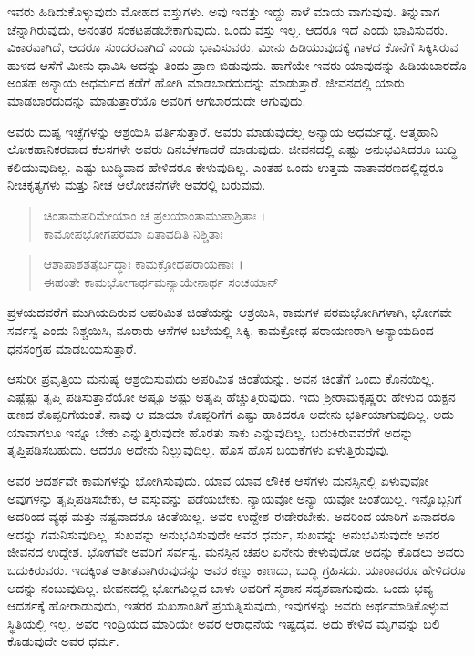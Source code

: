 ಇವರು ಹಿಡಿದುಕೊಳ್ಳುವುದು ಮೋಹದ ವಸ್ತುಗಳು. ಅವು ಇವತ್ತು ಇದ್ದು ನಾಳೆ ಮಾಯ ವಾಗುವುವು. ತಿನ್ನುವಾಗ ಚೆನ್ನಾಗಿರುವುದು, ಅನಂತರ ಸಂಕಟಪಡಬೇಕಾಗುವುದು. ಒಂದು ವಸ್ತು ಇಲ್ಲ. ಆದರೂ ಇದೆ ಎಂದು ಭಾವಿಸುವರು. ವಿಕಾರವಾಗಿದೆ, ಆದರೂ ಸುಂದರವಾಗಿದೆ ಎಂದು ಭಾವಿಸುವರು. ಮೀನು ಹಿಡಿಯುವುದಕ್ಕೆ ಗಾಳದ ಕೊನೆಗೆ ಸಿಕ್ಕಿಸಿರುವ ಹುಳದ ಆಸೆಗೆ ಮೀನು ಧಾವಿಸಿ ಅದನ್ನು ತಿಂದು ಪ್ರಾಣ ಬಿಡುವುದು. ಹಾಗೆಯೇ ಇವರು ಯಾವುದನ್ನು ಹಿಡಿಯಬಾರದೊ ಅಂತಹ ಅನ್ಯಾಯ ಅಧರ್ಮದ ಕಡೆಗೆ ಹೋಗಿ ಮಾಡಬಾರದುದನ್ನು ಮಾಡುತ್ತಾರೆ. ಜೀವನದಲ್ಲಿ ಯಾರು ಮಾಡಬಾರದುದನ್ನು ಮಾಡುತ್ತಾರೆಯೊ ಅವರಿಗೆ ಆಗಬಾರದುದೇ ಆಗುವುದು.

ಅವರು ದುಷ್ಟ ಇಚ್ಛೆಗಳನ್ನು ಆಶ್ರಯಿಸಿ ವರ್ತಿಸುತ್ತಾರೆ. ಅವರು ಮಾಡುವುದೆಲ್ಲ ಅನ್ಯಾಯ ಅಧರ್ಮದ್ದೆ. ಆತ್ಮಹಾನಿ ಲೋಕಹಾನಿಕರವಾದ ಕೆಲಸಗಳೇ ಅವರು ದಿನಬೆಳಗಾದರೆ ಮಾಡುವುದು. ಜೀವನದಲ್ಲಿ ಎಷ್ಟು ಅನುಭವಿಸಿದರೂ ಬುದ್ಧಿ ಕಲಿಯುವುದಿಲ್ಲ. ಎಷ್ಟು ಬುದ್ಧಿವಾದ ಹೇಳಿದರೂ ಕೇಳುವುದಿಲ್ಲ. ಎಂತಹ ಒಂದು ಉತ್ತಮ ವಾತಾವರಣದಲ್ಲಿದ್ದರೂ ನೀಚಕೃತ್ಯಗಳು ಮತ್ತು ನೀಚ ಆಲೋಚನೆಗಳೇ ಅವರಲ್ಲಿ ಬರುವುವು.

\begin{verse}
ಚಿಂತಾಮಪರಿಮೇಯಾಂ ಚ ಪ್ರಲಯಾಂತಾಮುಪಾಶ್ರಿತಾಃ ।\\ಕಾಮೋಪಭೋಗಪರಮಾ ಏತಾವದಿತಿ ನಿಶ್ಚಿತಾಃ 
\end{verse}

\begin{verse}
ಆಶಾಪಾಶಶತೈರ್ಬದ್ಧಾಃ ಕಾಮಕ್ರೋಧಪರಾಯಣಾಃ ।\\ಈಹಂತೇ ಕಾಮಭೋಗಾರ್ಥಮನ್ಯಾಯೇನಾರ್ಥ ಸಂಚಯಾನ್ 
\end{verse}

{\small ಪ್ರಳಯದವರೆಗೆ ಮುಗಿಯದಿರುವ ಅಪರಿಮಿತ ಚಿಂತೆಯನ್ನು ಆಶ್ರಯಿಸಿ, ಕಾಮಗಳ ಪರಮಭೋಗಿಗಳಾಗಿ, ಭೋಗವೇ ಸರ್ವಸ್ವ ಎಂದು ನಿಶ್ಚಯಿಸಿ, ನೂರಾರು ಆಸೆಗಳ ಬಲೆಯಲ್ಲಿ ಸಿಕ್ಕಿ, ಕಾಮಕ್ರೋಧ ಪರಾಯಣರಾಗಿ ಅನ್ಯಾಯದಿಂದ ಧನಸಂಗ್ರಹ ಮಾಡಬಯಸುತ್ತಾರೆ.}

ಆಸುರೀ ಪ್ರವೃತ್ತಿಯ ಮನುಷ್ಯ ಆಶ್ರಯಿಸುವುದು ಅಪರಿಮಿತ ಚಿಂತೆಯನ್ನು. ಅವನ ಚಿಂತೆಗೆ ಒಂದು ಕೊನೆಯಿಲ್ಲ. ಎಷ್ಟೆಷ್ಟು ತೃಪ್ತಿ ಪಡಿಸುತ್ತಾನೆಯೋ ಅಷ್ಟೂ ಅಷ್ಟು ಅತೃಪ್ತಿ ಹೆಚ್ಚುತ್ತಿರುವುದು. ಇದು ಶ್ರೀರಾಮಕೃಷ್ಣರು ಹೇಳುವ ಯಕ್ಷನ ಹಣದ ಕೊಪ್ಪರಿಗೆಯಂತೆ. ನಾವು ಆ ಮಾಯಾ ಕೊಪ್ಪರಿಗೆಗೆ ಎಷ್ಟು ಹಾಕಿದರೂ ಅದೇನು ಭರ್ತಿಯಾಗುವುದಿಲ್ಲ. ಅದು ಯಾವಾಗಲೂ ಇನ್ನೂ ಬೇಕು ಎನ್ನುತ್ತಿರುವುದೇ ಹೊರತು ಸಾಕು ಎನ್ನುವುದಿಲ್ಲ. ಬದುಕಿರುವವರೆಗೆ ಅದನ್ನು ತೃಪ್ತಿಪಡಿಸಬಹುದು. ಆದರೂ ಅದೇನು ನಿಲ್ಲುವುದಿಲ್ಲ. ಹೊಸ ಹೊಸ ಬಯಕೆಗಳು ಏಳುತ್ತಿರುವುವು.

ಅವರ ಆದರ್ಶವೇ ಕಾಮಗಳನ್ನು ಭೋಗಿಸುವುದು. ಯಾವ ಯಾವ ಲೌಕಿಕ ಆಸೆಗಳು ಮನಸ್ಸಿನಲ್ಲಿ ಏಳುವುವೋ ಅವುಗಳನ್ನು ತೃಪ್ತಿಪಡಿಸಬೇಕು, ಆ ವಸ್ತುವನ್ನು ಪಡೆಯಬೇಕು. ನ್ಯಾಯವೋ ಅನ್ಯಾ ಯವೋ ಚಿಂತೆಯಿಲ್ಲ. ಇನ್ನೊಬ್ಬನಿಗೆ ಅದರಿಂದ ವ್ಯಥೆ ಮತ್ತು ನಷ್ಟವಾದರೂ ಚಿಂತೆಯಿಲ್ಲ. ಅವರ ಉದ್ದೇಶ ಈಡೇರಬೇಕು. ಅದರಿಂದ ಯಾರಿಗೆ ಏನಾದರೂ ಅದನ್ನು ಗಮನಿಸುವುದಿಲ್ಲ. ಸುಖವನ್ನು ಅನುಭವಿಸುವುದೇ ಅವರ ಧರ್ಮ, ಸುಖವನ್ನು ಅನುಭವಿಸುವುದೇ ಅವರ ಜೀವನದ ಉದ್ದೇಶ. ಭೋಗವೇ ಅವರಿಗೆ ಸರ್ವಸ್ವ. ಮನಸ್ಸಿನ ಚಪಲ ಏನೇನು ಕೇಳುವುದೋ ಅದನ್ನು ಕೊಡಲು ಅವರು ಬದುಕಿರುವರು. ಇದಕ್ಕಿಂತ ಅತೀತವಾಗಿರುವುದನ್ನು ಅವರ ಕಣ್ಣು ಕಾಣದು, ಬುದ್ಧಿ ಗ್ರಹಿಸದು. ಯಾರಾದರೂ ಹೇಳಿದರೂ ಅದನ್ನು ನಂಬುವುದಿಲ್ಲ. ಜೀವನದಲ್ಲಿ ಭೋಗವಿಲ್ಲದ ಬಾಳು ಅವರಿಗೆ ಸ್ಮಶಾನ ಸದೃಶವಾಗುವುದು. ಒಂದು ಭವ್ಯ ಆದರ್ಶಕ್ಕೆ ಹೋರಾಡುವುದು, ಇತರರ ಸುಖಶಾಂತಿಗೆ ಪ್ರಯತ್ನಿಸುವುದು, ಇವುಗಳನ್ನು ಅವರು ಅರ್ಥಮಾಡಿಕೊಳ್ಳುವ ಸ್ಥಿತಿಯಲ್ಲಿ ಇಲ್ಲ. ಅವರ ಇಂದ್ರಿಯದ ಮಾರಿಯೇ ಅವರ ಆರಾಧನೆಯ ಇಷ್ಟದೈವ. ಅದು ಕೇಳಿದ ಮೃಗವನ್ನು ಬಲಿ ಕೊಡುವುದೇ ಅವರ ಧರ್ಮ. 

